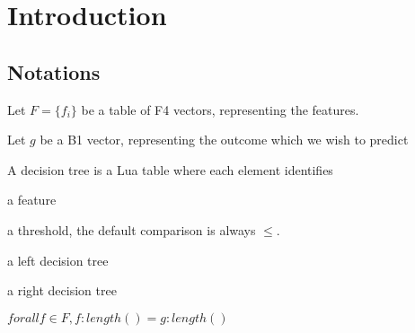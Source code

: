 
\section{Introduction}

\subsection{Notations}

\bi
\item Let \(F = \{f_i\}\) be a table of F4 vectors, representing the features.
\item Let \(g\) be a B1 vector, representing the outcome which we wish to
predict
\ei

A decision tree is a Lua table where each element identifies
\be
\item a feature
\item a threshold, the default comparison is always \(\leq\).
\item a left decision tree
\item a right decision tree
\ee

\begin{invariant}
\(forall f \in F, f:length() = g:length()\)
\end{invariant}

